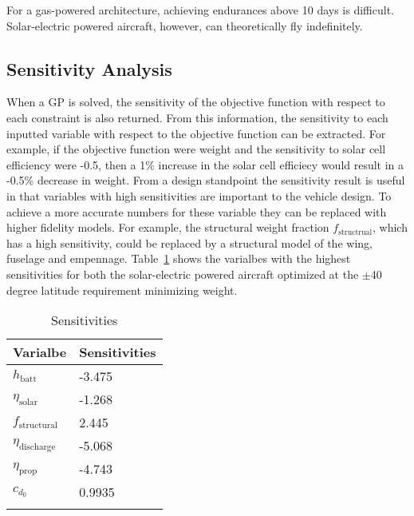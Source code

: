 \documentclass[]{aiaa-tc}%
\begin{document}
For a gas-powered architecture, achieving endurances above 10 days is difficult.  Solar-electric powered aircraft, however, can theoretically fly indefinitely. 

\subsection{Sensitivity Analysis}

When a GP is solved, the sensitivity of the objective function with respect to each constraint is also returned.  From this information, the sensitivity to each inputted variable with respect to the objective function can be extracted.\cite{hoburgthesis} 
For example, if the objective function were weight and the sensitivity to solar cell efficiency were -0.5, then a 1\% increase in the solar cell efficiecy would result in a -0.5\% decrease in weight.  
From a design standpoint the sensitivity result is useful in that variables with high sensitivities are important to the vehicle design. 
To achieve a more accurate numbers for these variable they can be replaced with higher fidelity models.  
For example, the structural weight fraction $f_{\text{structrual}}$, which has a high sensitivity, could be replaced by a structural model of the wing, fuselage and empennage. 
Table~\ref{t:sens} shows the varialbes with the highest sensitivities for both the solar-electric powered aircraft optimized at the $\pm$40 degree latitude requirement minimizing weight. 

\begin{longtable}{ll}
\caption{Sensitivities} \\
\toprule
\toprule
 Varialbe & Sensitivities \\
\midrule
$h_{\text{batt}}$         & -3.475 \\
$\eta_{\text{solar}}$     & -1.268 \\
$f_{\text{structural}}$   & 2.445  \\
$\eta_{\text{discharge}}$ & -5.068 \\
$\eta_{\text{prop}}$      & -4.743 \\
$c_{d_0}$                 & 0.9935 \\
\bottomrule
\label{t:sens}
 \end{longtable}
\end{document}
